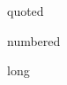 \documentclass{article}
\begin{document}
\begin{numquote*}quoted\end{numquote*}
\begin{numquote}[5]numbered\end{numquote}
\begin{numquotation*}long\end{numquotation*}
\end{document}
